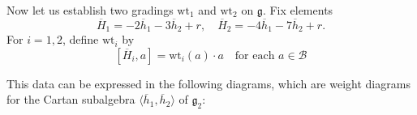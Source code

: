 \documentclass[11pt,letterpaper]{amsart}
\numberwithin{equation}{section}
\newcommand{\oline}{\overline}
\begin{document}
Now let us establish two gradings $\mathrm{wt}_1$ and $\mathrm{wt}_2$ on $\mathfrak{g}$. Fix elements
\begin{equation}
    \label{grading elts}
    \oline H_1 = -2\oline h_1-3\oline h_2 + r,\quad \oline H_2 = -4\oline{h}_1-7\oline{h}_2 + r.
\end{equation} For $i=1,2$, define $\mathrm{wt}_i$ by
\begin{equation}
    \label{def Jacobi weight 1}
    [\oline H_i,a] = \mathrm{wt}_i(a)\cdot a\quad \text{for each }a\in \mathcal{B}
\end{equation}

This data can be expressed in the following diagrams, which are weight diagrams for the Cartan subalgebra $\langle \oline{h}_1,\oline{h}_2\rangle$ of $\mathfrak{g}_2$: 

\end{document}
